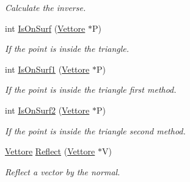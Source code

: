 \begin{DoxyCompactItemize}
\begin{DoxyCompactList}\small\item\em \-Calculate the inverse. \end{DoxyCompactList}\item 
\hypertarget{classPiano_ad605fc62ded454a95190f42608532c64}{int \hyperlink{classPiano_ad605fc62ded454a95190f42608532c64}{\-Is\-On\-Surf} (\hyperlink{classVettore}{\-Vettore} $\ast$\-P)}\label{classPiano_ad605fc62ded454a95190f42608532c64}

\begin{DoxyCompactList}\small\item\em \-If the point is inside the triangle. \end{DoxyCompactList}\item 
\hypertarget{classPiano_a4e22ad7774b15806c2da88e9ee6f0bf5}{int \hyperlink{classPiano_a4e22ad7774b15806c2da88e9ee6f0bf5}{\-Is\-On\-Surf1} (\hyperlink{classVettore}{\-Vettore} $\ast$\-P)}\label{classPiano_a4e22ad7774b15806c2da88e9ee6f0bf5}

\begin{DoxyCompactList}\small\item\em \-If the point is inside the triangle first method. \end{DoxyCompactList}\item 
\hypertarget{classPiano_a4791ab5ce64e6a050c906d06d8f248ce}{int \hyperlink{classPiano_a4791ab5ce64e6a050c906d06d8f248ce}{\-Is\-On\-Surf2} (\hyperlink{classVettore}{\-Vettore} $\ast$\-P)}\label{classPiano_a4791ab5ce64e6a050c906d06d8f248ce}

\begin{DoxyCompactList}\small\item\em \-If the point is inside the triangle second method. \end{DoxyCompactList}\item 
\hypertarget{classPiano_aaa1ed0db1c12ff7d0bbb4bfc5c4c7369}{\hyperlink{classVettore}{\-Vettore} \hyperlink{classPiano_aaa1ed0db1c12ff7d0bbb4bfc5c4c7369}{\-Reflect} (\hyperlink{classVettore}{\-Vettore} $\ast$\-V)}\label{classPiano_aaa1ed0db1c12ff7d0bbb4bfc5c4c7369}

\begin{DoxyCompactList}\small\item\em \-Reflect a vector by the normal. \end{DoxyCompactList}\end{DoxyCompactItemize}
